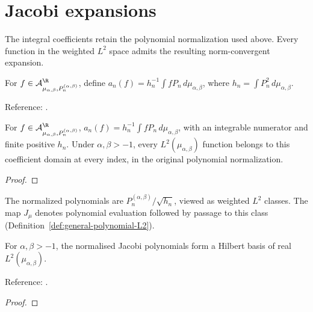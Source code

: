 \section{Jacobi expansions}\label{sec:textbook-jacobi-expansion}

The integral coefficients retain the polynomial normalization used above. Every function in the weighted $L^2$ space admits the resulting norm-convergent expansion.

\begin{definition}
\label{def:jacobi-coefficients}
\leanok
For $f\in\mathcal A_{\mu_{\alpha,\beta},P_n^{(\alpha,\beta)}}^{\R}$, define $a_n(f)=h_n^{-1}\int fP_n\,d\mu_{\alpha,\beta}$, where
$h_n=\int P_n^2\,d\mu_{\alpha,\beta}$.

Reference: \cite[18.2(viii)]{dlmf}.
\end{definition}

\begin{theorem}
\label{thm:jacobi-coefficient-characterisation}
\leanok
For $f\in\mathcal A_{\mu_{\alpha,\beta},P_n^{(\alpha,\beta)}}^{\R}$, $a_n(f)=h_n^{-1}\int fP_n\,d\mu_{\alpha,\beta}$, with an integrable numerator
and finite positive $h_n$. Under $\alpha,\beta>-1$, every $L^2(\mu_{\alpha,\beta})$ function belongs to this coefficient domain at every index, in the original polynomial normalization.
\end{theorem}
\begin{proof}
\leanok
\end{proof}

The normalized polynomials are $P_n^{(\alpha,\beta)}/\sqrt{h_n}$, viewed as weighted $L^2$ classes. The map $J_\mu$ denotes polynomial evaluation followed by passage to this class (Definition~\ref{def:general-polynomial-L2}).

\begin{theorem}
\label{thm:jacobi-basis}
\leanok
For $\alpha,\beta>-1$, the normalised Jacobi polynomials form a Hilbert basis of real $L^2(\mu_{\alpha,\beta})$.

Reference: \cite[18.2(viii)]{dlmf}.
\end{theorem}
\begin{proof}
\leanok
\end{proof}

